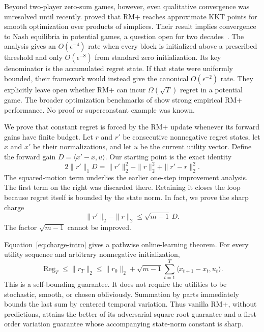 \documentclass{article}
\newcommand{\Reg}{\operatorname{Reg}}
\begin{document}
Beyond two-player zero-sum games, however, even qualitative convergence was unresolved until recently. \citet{Anagnostides26:Convergence} proved that RM+ reaches approximate KKT points for smooth optimization over products of simplices. Their result implies convergence to Nash equilibria in potential games, a question open for two decades~\citep{Marden07:Regret,Kleinberg09:Multiplicative}. The analysis gives an $O(\epsilon^{-4})$ rate when every block is initialized above a prescribed threshold and only $O(\epsilon^{-8})$ from standard zero initialization. Its key denominator is the accumulated regret state. If that state were uniformly bounded, their framework would instead give the canonical $O(\epsilon^{-2})$ rate. They explicitly leave open whether RM+ can incur $\Omega(\sqrt T)$ regret in a potential game. The broader optimization benchmarks of \citet{Tewolde26:Decision} show strong empirical RM+ performance. No proof or superconstant example was known.

We prove that constant regret is forced by the RM+ update whenever its forward gains have finite budget. Let $r$ and $r'$ be consecutive nonnegative regret states, let $x$ and $x'$ be their normalizations, and let $u$ be the current utility vector. Define the forward gain $D=\langle x'-x,u\rangle$. Our starting point is the exact identity
\begin{equation}
2\|r'\|_1D=\|r'\|_2^2-\|r\|_2^2+\|r'-r\|_2^2.
\label{eq:identity-intro}
\end{equation}
The squared-motion term underlies the earlier one-step improvement analysis. The first term on the right was discarded there. Retaining it closes the loop because regret itself is bounded by the state norm. In fact, we prove the sharp charge
\begin{equation}
\|r'\|_2-\|r\|_2\le \sqrt{m-1}\,D.
\label{eq:charge-intro}
\end{equation}
The factor $\sqrt{m-1}$ cannot be improved.

Equation~\eqref{eq:charge-intro} gives a pathwise online-learning theorem. For every utility sequence and arbitrary nonnegative initialization,
\begin{equation}
\Reg_T\le \|r_T\|_2\le \|r_0\|_2+\sqrt{m-1}\sum_{t=1}^T\langle x_{t+1}-x_t,u_t\rangle.
\label{eq:path-intro}
\end{equation}
This is a self-bounding guarantee. It does not require the utilities to be stochastic, smooth, or chosen obliviously. Summation by parts immediately bounds the last sum by centered temporal variation. Thus vanilla RM+, without predictions, attains the better of its adversarial square-root guarantee and a first-order variation guarantee whose accompanying state-norm constant is sharp.
\end{document}
